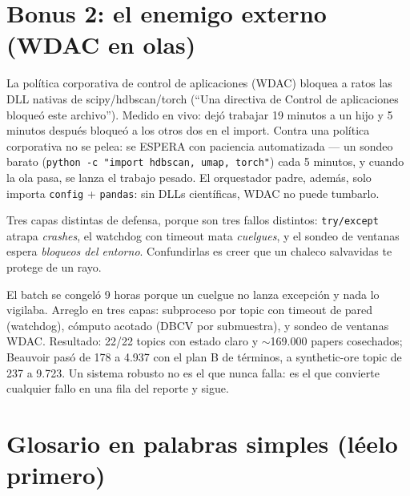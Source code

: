 \documentclass[11pt,a4paper]{article}
\begin{document}
\section{Bonus 2: el enemigo externo (WDAC en olas)}

La política corporativa de control de aplicaciones (WDAC) bloquea a ratos las DLL
nativas de scipy/hdbscan/torch (``Una directiva de Control de aplicaciones bloqueó este
archivo''). Medido en vivo: dejó trabajar 19 minutos a un hijo y 5 minutos después
bloqueó a los otros dos en el import. Contra una política corporativa no se pelea:
se ESPERA con paciencia automatizada --- un sondeo barato
(\texttt{python -c "import hdbscan, umap, torch"}) cada 5 minutos, y cuando la ola
pasa, se lanza el trabajo pesado. El orquestador padre, además, solo importa
\texttt{config} + \texttt{pandas}: sin DLLs científicas, WDAC no puede tumbarlo.

\begin{ojo}
Tres capas distintas de defensa, porque son tres fallos distintos: \texttt{try/except}
atrapa \emph{crashes}, el watchdog con timeout mata \emph{cuelgues}, y el sondeo de
ventanas espera \emph{bloqueos del entorno}. Confundirlas es creer que un chaleco
salvavidas te protege de un rayo.
\end{ojo}

\begin{resumen}
El batch se congeló 9 horas porque un cuelgue no lanza excepción y nada lo vigilaba.
Arreglo en tres capas: subproceso por topic con timeout de pared (watchdog), cómputo
acotado (DBCV por submuestra), y sondeo de ventanas WDAC. Resultado: 22/22 topics con
estado claro y $\sim$169.000 papers cosechados; Beauvoir pasó de 178 a 4.937 con el
plan B de términos, a synthetic-ore topic de 237 a 9.723. Un sistema robusto no es el que nunca falla:
es el que convierte cualquier fallo en una fila del reporte y sigue.
\end{resumen}
\clearpage
{}
{}

\section{Glosario en palabras simples (léelo primero)}
\end{document}

